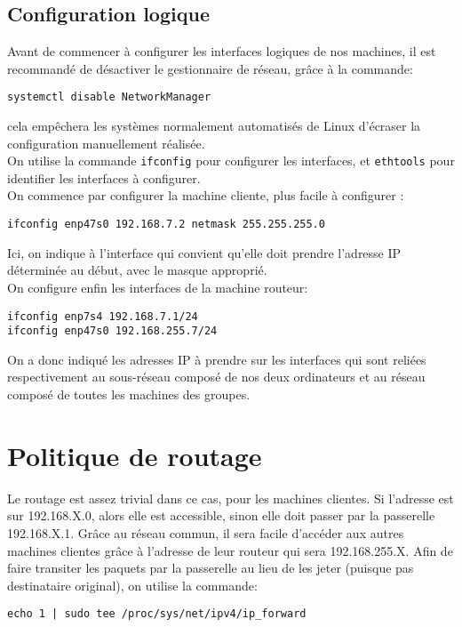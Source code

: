\subsection{Configuration logique}
Avant de commencer à configurer les interfaces logiques de nos machines, il est recommandé de désactiver le gestionnaire de réseau, grâce à la commande:

\begin{verbatim}
systemctl disable NetworkManager
\end{verbatim}

cela empêchera les systèmes normalement automatisés de Linux d'écraser la configuration manuellement réalisée.\\
On utilise la commande \texttt{ifconfig} pour configurer les interfaces, et \texttt{ethtools} pour identifier les interfaces à configurer.\\
On commence par configurer la machine cliente, plus facile à configurer :

\begin{verbatim}
ifconfig enp47s0 192.168.7.2 netmask 255.255.255.0
\end{verbatim}

Ici, on indique à l'interface qui convient qu'elle doit prendre l'adresse IP déterminée au début, avec le masque approprié.\\
On configure enfin les interfaces de la machine routeur:
\begin{verbatim}
ifconfig enp7s4 192.168.7.1/24
ifconfig enp47s0 192.168.255.7/24
\end{verbatim}
On a donc indiqué les adresses IP à prendre sur les interfaces qui sont reliées respectivement au sous-réseau composé de nos deux ordinateurs et au réseau composé de toutes les machines des groupes.

\section{Politique de routage}
Le routage est assez trivial dans ce cas, pour les machines clientes. Si l'adresse est sur 192.168.X.0, alors elle est accessible, sinon elle doit passer par la passerelle 192.168.X.1. Grâce au réseau commun, il sera facile d'accéder aux autres machines clientes grâce à l'adresse de leur routeur qui sera 192.168.255.X. Afin de faire transiter les paquets par la passerelle au lieu de les jeter (puisque pas destinataire original), on utilise la commande:

\begin{verbatim}
echo 1 | sudo tee /proc/sys/net/ipv4/ip_forward
\end{verbatim}

